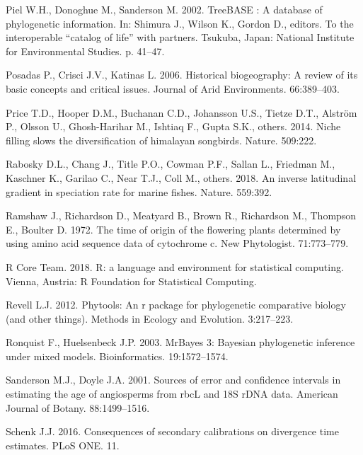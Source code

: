 \documentclass[]{article}
\begin{document}
\leavevmode\hypertarget{ref-Piel2002}{}%
Piel W.H., Donoghue M., Sanderson M. 2002. TreeBASE : A database of phylogenetic information. In: Shimura J., Wilson K., Gordon D., editors. To the interoperable ``catalog of life'' with partners. Tsukuba, Japan: National Institute for Environmental Studies. p. 41--47.

\leavevmode\hypertarget{ref-posadas2006historical}{}%
Posadas P., Crisci J.V., Katinas L. 2006. Historical biogeography: A review of its basic concepts and critical issues. Journal of Arid Environments. 66:389--403.

\leavevmode\hypertarget{ref-price2014niche}{}%
Price T.D., Hooper D.M., Buchanan C.D., Johansson U.S., Tietze D.T., Alström P., Olsson U., Ghosh-Harihar M., Ishtiaq F., Gupta S.K., others. 2014. Niche filling slows the diversification of himalayan songbirds. Nature. 509:222.

\leavevmode\hypertarget{ref-rabosky2018inverse}{}%
Rabosky D.L., Chang J., Title P.O., Cowman P.F., Sallan L., Friedman M., Kaschner K., Garilao C., Near T.J., Coll M., others. 2018. An inverse latitudinal gradient in speciation rate for marine fishes. Nature. 559:392.

\leavevmode\hypertarget{ref-ramshaw1972time}{}%
Ramshaw J., Richardson D., Meatyard B., Brown R., Richardson M., Thompson E., Boulter D. 1972. The time of origin of the flowering plants determined by using amino acid sequence data of cytochrome c. New Phytologist. 71:773--779.

\leavevmode\hypertarget{ref-RCoreTeam2018}{}%
R Core Team. 2018. R: a language and environment for statistical computing. Vienna, Austria: R Foundation for Statistical Computing.

\leavevmode\hypertarget{ref-Revell2012}{}%
Revell L.J. 2012. Phytools: An r package for phylogenetic comparative biology (and other things). Methods in Ecology and Evolution. 3:217--223.

\leavevmode\hypertarget{ref-Ronquist2003}{}%
Ronquist F., Huelsenbeck J.P. 2003. MrBayes 3: Bayesian phylogenetic inference under mixed models. Bioinformatics. 19:1572--1574.

\leavevmode\hypertarget{ref-sanderson2001sources}{}%
Sanderson M.J., Doyle J.A. 2001. Sources of error and confidence intervals in estimating the age of angiosperms from rbcL and 18S rDNA data. American Journal of Botany. 88:1499--1516.

\leavevmode\hypertarget{ref-schenk2016sec}{}%
Schenk J.J. 2016. Consequences of secondary calibrations on divergence time estimates. PLoS ONE. 11.
\end{document}
